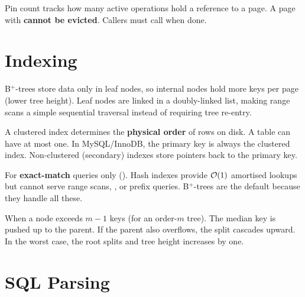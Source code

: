 \begin{interviewbox}
Pin count tracks how many active operations hold a reference to a page.  A page with  \textbf{cannot be evicted}.  Callers must call  when done.
\end{interviewbox}

\section{Indexing}

\begin{interviewbox}
B$^+$-trees store data only in leaf nodes, so internal nodes hold more keys per page (lower tree height).  Leaf nodes are linked in a doubly-linked list, making range scans a simple sequential traversal instead of requiring tree re-entry.
\end{interviewbox}

\begin{interviewbox}
A clustered index determines the \textbf{physical order} of rows on disk.  A table can have at most one.  In MySQL/InnoDB, the primary key is always the clustered index.  Non-clustered (secondary) indexes store pointers back to the primary key.
\end{interviewbox}

\begin{interviewbox}
For \textbf{exact-match} queries only ().  Hash indexes provide $\mathcal{O}(1)$ amortised lookups but cannot serve range scans, , or prefix  queries.  B$^+$-trees are the default because they handle all these.
\end{interviewbox}

\begin{interviewbox}
When a node exceeds $m-1$ keys (for an order-$m$ tree).  The median key is pushed up to the parent.  If the parent also overflows, the split cascades upward.  In the worst case, the root splits and tree height increases by one.
\end{interviewbox}

\section{SQL Parsing}

